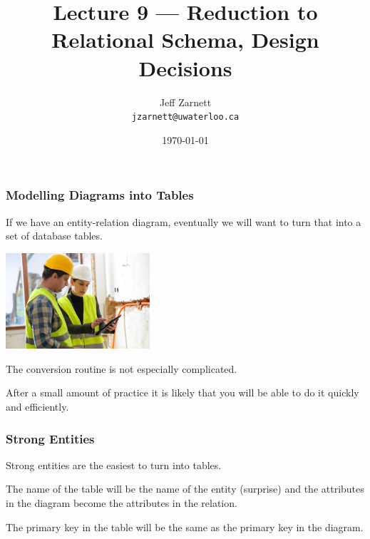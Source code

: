 

\title{Lecture 9 --- Reduction to Relational Schema, Design Decisions}

\author{Jeff Zarnett \\ \small \texttt{jzarnett@uwaterloo.ca}}
\date{\today}




\begin{frame}
  \titlepage

 \end{frame}



\begin{frame}
\frametitle{Modelling Diagrams into Tables}

If we have an entity-relation diagram, eventually we will want to turn that into a set of database tables. 

\begin{center}
	\includegraphics[width=0.4\textwidth]{images/building-plan.jpg}
\end{center}

The conversion routine is not especially complicated. 

After a small amount of practice it is likely that you will be able to do it quickly and efficiently.

\end{frame}



\begin{frame}
\frametitle{Strong Entities}

Strong entities are the easiest to turn into tables. 

The name of the table will be the name of the entity (surprise) and the attributes in the diagram become the attributes in the relation. 

The primary key in the table will be the same as the primary key in the diagram. 


\end{frame}



